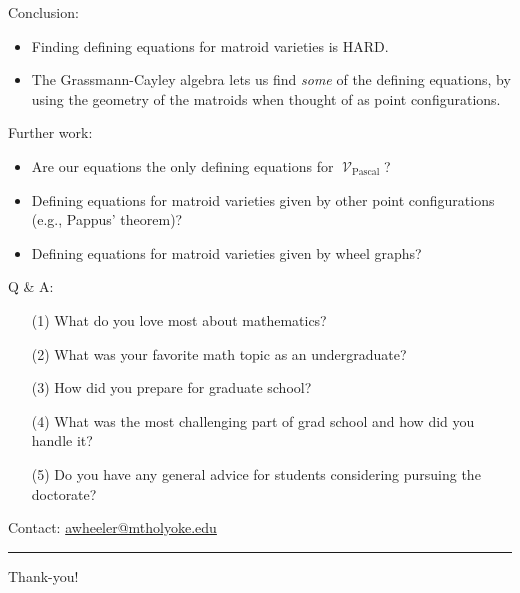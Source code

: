 \documentclass[%
	12pt]{beamer}
\theoremstyle{plain}
\theoremstyle{definition}
\DeclareMathOperator{\Var}{\mathcal V}
\begin{document}
\begin{frame}{}{}
{\color{powCol} Conclusion:} \pause
\vspace{0.25pc}
\begin{itemize}
\item Finding defining equations for matroid varieties is HARD. \pause
\item The Grassmann-Cayley algebra lets us find \emph{some} of the defining equations, by using the geometry of the matroids when thought of as point configurations.
\end{itemize}
\pause
\vspace{1pc}
\textcolor{powCol}{Further work:} \pause
\vspace{0.25pc}
\begin{itemize}
\item Are our equations the only defining equations for $\Var_{\text{Pascal}}$? \pause
\item Defining equations for matroid varieties given by other point configurations (e.g., Pappus' theorem)? \pause
\item Defining equations for matroid varieties given by wheel graphs?
\end{itemize}
\end{frame}

\begin{frame}
\textcolor{powCol}{Q \& A:} \pause
\vspace{0.25pc}
\begin{itemize}
\item[(1)] What do you love most about mathematics? \pause
\item[(2)] What was your favorite math topic as an undergraduate? \pause
\item[(3)] How did you prepare for graduate school? \pause
\item[(4)] What was the most challenging part of grad school and how did you handle it? \pause
\item[(5)] Do you have any general advice for students considering pursuing the doctorate? \pause
\end{itemize}

\vspace{1pc}
\textcolor{powCol}{Contact:} \url{awheeler@mtholyoke.edu}
\pause
\vspace{1pc}
\hrule

\vspace{0.25pc}
{\color{powCol}
\begin{flushright}
Thank-you!
\end{flushright}
}
\end{frame}
\end{document}
